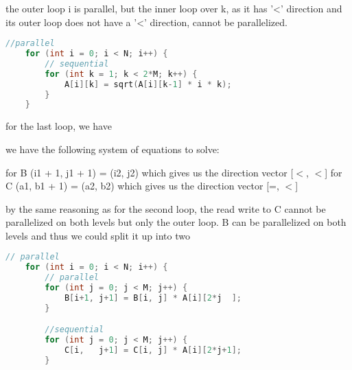 \documentclass{article}
\begin{document}
\begin{itemize}
    the outer loop i is parallel, but the inner loop over k, as it has '<' direction and its outer loop does not have a '<' direction, cannot be parallelized.


    \begin{lstlisting}[language=c]
    //parallel
    for (int i = 0; i < N; i++) {
        // sequential 
        for (int k = 1; k < 2*M; k++) {
            A[i][k] = sqrt(A[i][k-1] * i * k);
        }
    }
    \end{lstlisting}

    for the last loop, we have 

    we have the following system of equations to solve:

    for B
    (i1 + 1, j1 + 1) = (i2, j2) which gives us the direction vector [$<$, $<$]
    for C
    (a1, b1 + 1) = (a2, b2) which gives us the direction vector [=, $<$]
 

    by the same reasoning as for the second loop, the read write to C cannot be parallelized on both levels but only the outer loop.
    B can be parallelized on both levels and thus we could split it up into two

    \begin{lstlisting}[language=c]
    // parallel
    for (int i = 0; i < N; i++) {
        // parallel
        for (int j = 0; j < M; j++) {
            B[i+1, j+1] = B[i, j] * A[i][2*j  ];
        }

        //sequential
        for (int j = 0; j < M; j++) {
            C[i,   j+1] = C[i, j] * A[i][2*j+1];
        }
        

\end{lstlisting}
\end{itemize}
\end{document}
